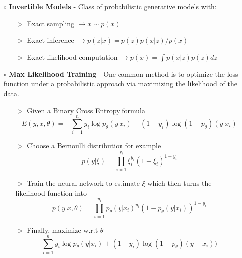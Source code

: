 \documentclass[10pt,a4paper]{article}
\begin{document}
\begin{description}[font=$\bullet$~\normalfont\scshape\color{blue!50!black}]
\begin{itemize}
    \item[$\circ$] \textbf{Invertible Models} - Class of probabilistic generative models with: 
    \begin{itemize}
        \item[$\vartriangleright$] Exact sampling $\longrightarrow x \sim p(x) $
        \item[$\vartriangleright$] Exact inference $\longrightarrow p(z|x) = p(z)p(x|z)/p(x)$
        \item[$\vartriangleright$] Exact likelihood computation $\longrightarrow p(x) = \displaystyle \int p(x|z)p(z) dz$
    \end{itemize}
    \item[$\circ$] \textbf{Max Likelihood Training} - One common method is to optimize the loss function under a probabilistic approach via maximizing the likelihood of the data. 
    \begin{itemize}
        \item[$\vartriangleright$] Given a Binary Cross Entropy formula
        \begin{equation}
            E(y, x, \theta) = - \sum_{i=1}^{n} y_{i}\log p_{\theta} (y|x_{i}) + (1 - y_{i})\log (1 - p_{\theta})(y|x_{i})
        \end{equation}
        \item[$\vartriangleright$] Choose a Bernoulli distribution for example
        \begin{equation}
            p(y|\xi) = \prod_{i=1}^{y_{i}}\xi_{i}^{y_{i}}(1 - \xi_{i})^{1 - y_{i}}
        \end{equation}
        
        \item[$\vartriangleright$] Train the neural network to estimate $\xi$ which then turns the likelihood function into
    \begin{equation}
        p(y|x, \theta) = \prod_{i=1}^{y_{i}} p_{\theta}(y|x_{i})^{y_{i}}(1 - p_{\theta}(y|x_{i}))^{1 - y_{i}}
    \end{equation}
    \item[$\vartriangleright$] Finally, maximize w.r.t $\theta$
    \begin{equation}
        \sum_{i=1}^{n}y_{i}\log p_{\theta}(y|x_{i}) + (1 - y_{i}) \log (1 - p_{\theta})(y - x_{i}))
    \end{equation}
    \end{itemize}
    
\end{itemize}
\end{description}
\end{document}
